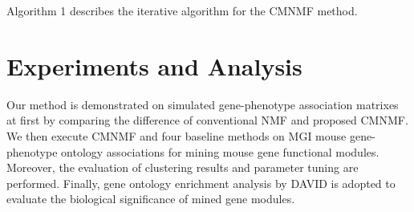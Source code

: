 \documentclass{bmcart}
\begin{document}
Algorithm 1 describes the iterative algorithm for the CMNMF method.



\section*{Experiments and Analysis}
Our method is demonstrated on simulated gene-phenotype association matrixes at first by comparing the difference of conventional NMF and proposed CMNMF. We then execute CMNMF and four baseline methods on MGI mouse gene-phenotype ontology associations for mining mouse gene functional modules. Moreover, the evaluation of clustering results and parameter tuning are performed. Finally, gene ontology enrichment analysis by DAVID is adopted to evaluate the biological significance of mined gene modules.
\end{document}
